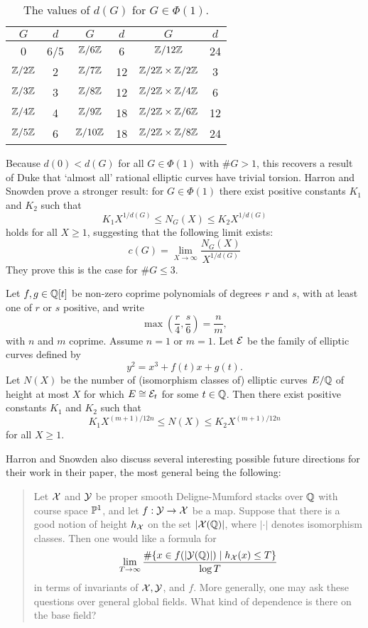 	\begin{table}[!ht]
	\centering
	\caption{The values of $d(G)$ for $G \in \Phi(1)$.\label{tab:harronsnowden}}
	\begin{tabular}{|c|c||c|c||c|c|} \hline
	$G$ & $d$ & $G$ & $d$ & $G$ & $d$ \\ \hline\hline
	0 & 6/5 & $\Z/6\Z$ & 6 & $\Z/12\Z$ & 24 \\ \hline
	$\Z/2\Z$ & 2 & $\Z/7\Z$ & 12 & $\Z/2\Z \times \Z/2\Z$ & 3 \\ \hline
	$\Z/3\Z$ & 3 & $\Z/8\Z$ & 12 & $\Z/2\Z \times \Z/4\Z$ & 6 \\ \hline
	$\Z/4\Z$ & 4 & $\Z/9\Z$ & 18 & $\Z/2\Z \times \Z/6\Z$ & 12 \\ \hline
	$\Z/5\Z$ & 6 & $\Z/10\Z$ & 18 & $\Z/2\Z \times \Z/8\Z$ & 24 \\ \hline
	\end{tabular}
	\end{table}


Because $d(0) < d(G)$ for all $G \in \Phi(1)$ with $\#G > 1$, this recovers a result of Duke \cite{duke97} that `almost all' rational elliptic curves have trivial torsion. Harron and Snowden prove a stronger result: for $G \in \Phi(1)$ there exist positive constants $K_1$ and $K_2$ such that
	\[
	K_1 X^{1/d(G)} \leq N_G(X) \leq K_2 X^{1/d(G)}
	\]
holds for all $X \geq 1$, suggesting that the following limit exists:
	\[
	c(G)= \lim_{X \to \infty} \dfrac{N_G(X)}{X^{1/d(G)}}
	\]
They prove this is the case for $\#G \leq 3$.


\begin{thm} \label{thm:harronsnowden}
Let $f, g \in \Q[t]$ be non-zero coprime polynomials of degrees $r$ and $s$, with at least one of $r$ or $s$ positive, and write
	\[
	\max\left( \dfrac{r}{4}, \dfrac{s}{6} \right)= \dfrac{n}{m},
	\]
with $n$ and $m$ coprime. Assume $n= 1$ or $m= 1$. Let $\cE$ be the family of elliptic curves defined by
	\[
	y^2= x^3 + f(t)x + g(t).
	\]
Let $N(X)$ be the number of (isomorphism classes of) elliptic curves $E/\Q$ of height at most $X$ for which $E \cong \cE_t$ for some $t \in \Q$. Then there exist positive constants $K_1$ and $K_2$ such that
	\[
	K_1X^{(m+1)/12n} \leq N(X) \leq K_2 X^{(m+1)/12n}
	\]
for all $X \geq 1$. 
\end{thm}


Harron and Snowden also discuss several interesting possible future directions for their work in their paper, the most general being the following:


\begin{quote}
 Let $\cX$ and $\cY$ be proper smooth Deligne-Mumford stacks over $\Q$ with course space $\P^1$, and let $f: \cY \to \cX$ be a map. Suppose that there is a good notion of height $h_\cX$ on the set $|\cX(\Q)|$, where $|\cdot|$ denotes isomorphism classes. Then one would like a formula for
	\[
	\lim_{T \to \infty} \dfrac{\# \{ x \in f(|\cY(\Q)|) \;|\; h_\cX(x) \leq T \}}{\log T}
	\]
in terms of invariants of $\cX, \cY$, and $f$. More generally, one may ask these questions over general global fields. What kind of dependence is there on the base field?
\end{quote}


